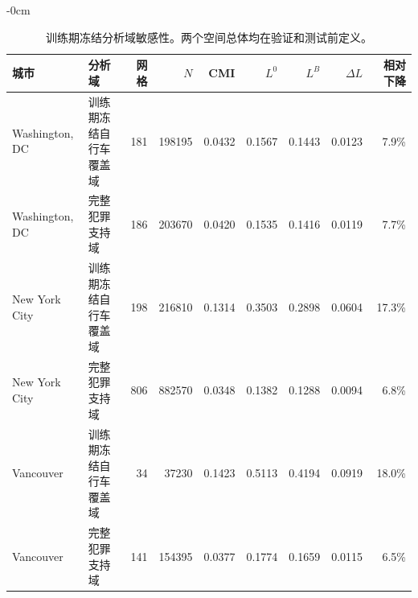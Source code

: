\begin{table}[!htbp]
\begin{adjustwidth}{-\extralength}{0cm}
\caption{训练期冻结分析域敏感性。两个空间总体均在验证和测试前定义。}
\label{tab:sup_frozen_domain}
\centering
\scriptsize
\setlength{\tabcolsep}{3pt}
\begin{tabular}{llrrrrrrr}
\toprule
\textbf{城市} & \textbf{分析域} & \textbf{网格} & \textbf{$N$} & \textbf{CMI} & \textbf{$L^0$} & \textbf{$L^B$} & \textbf{$\Delta L$} & \textbf{相对下降}\\
\midrule
Washington, DC & 训练期冻结自行车覆盖域 & 181 & 198195 & 0.0432 & 0.1567 & 0.1443 & 0.0123 & 7.9\%\\
Washington, DC & 完整犯罪支持域 & 186 & 203670 & 0.0420 & 0.1535 & 0.1416 & 0.0119 & 7.7\%\\
New York City & 训练期冻结自行车覆盖域 & 198 & 216810 & 0.1314 & 0.3503 & 0.2898 & 0.0604 & 17.3\%\\
New York City & 完整犯罪支持域 & 806 & 882570 & 0.0348 & 0.1382 & 0.1288 & 0.0094 & 6.8\%\\
Vancouver & 训练期冻结自行车覆盖域 & 34 & 37230 & 0.1423 & 0.5113 & 0.4194 & 0.0919 & 18.0\%\\
Vancouver & 完整犯罪支持域 & 141 & 154395 & 0.0377 & 0.1774 & 0.1659 & 0.0115 & 6.5\%\\
\bottomrule
\end{tabular}
\end{adjustwidth}
\end{table}
